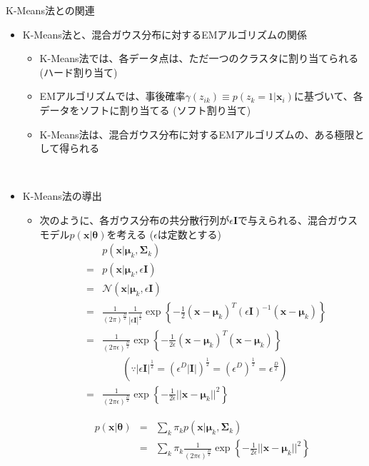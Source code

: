\documentclass[dvipdfmx,notheorems,t]{beamer}
\begin{document}
\begin{frame}{K-Means法との関連}

\begin{itemize}
	\item K-Means法と、混合ガウス分布に対するEMアルゴリズムの関係
	\begin{itemize}
		\item K-Means法では、各データ点は、ただ一つのクラスタに割り当てられる (\alert{ハード割り当て})
		\item EMアルゴリズムでは、事後確率$\gamma(z_{ik}) \equiv p(z_k = 1 | \bm{x}_i)$に基づいて、各データをソフトに割り当てる (\alert{ソフト割り当て})
		\newline
		\item K-Means法は、混合ガウス分布に対するEMアルゴリズムの、\alert{ある極限として得られる}
	\end{itemize} \
	
	\framebreak
	
	\item K-Means法の導出
	\begin{itemize}
		\item 次のように、各ガウス分布の共分散行列が$\epsilon \bm{I}$で与えられる、混合ガウスモデル$p(\bm{x} | \bm{\theta})$を考える ($\epsilon$は定数とする)
		\begin{eqnarray}
			&& p(\bm{x} | \bm{\mu}_k, \bm{\Sigma}_k) \nonumber \\
			&=& p(\bm{x} | \bm{\mu}_k, \epsilon \bm{I}) \nonumber \\
			&=& \mathcal{N}(\bm{x} | \bm{\mu}_k, \epsilon \bm{I}) \nonumber \\
			&=& \frac{1}{(2\pi)^\frac{D}{2}} \frac{1}{|\epsilon \bm{I}|^\frac{1}{2}} \exp \left\{ -\frac{1}{2} (\bm{x} - \bm{\mu}_k)^T (\epsilon \bm{I})^{-1} (\bm{x} - \bm{\mu}_k) \right\} \\
			&=& \frac{1}{(2\pi \epsilon)^\frac{D}{2}} \exp \left\{ -\frac{1}{2\epsilon} (\bm{x} - \bm{\mu}_k)^T (\bm{x} - \bm{\mu}_k) \right\} \\
			&& \qquad (\because |\epsilon \bm{I}|^\frac{1}{2} = \left( \epsilon^D |\bm{I}| \right)^\frac{1}{2} = \left( \epsilon^D \right)^\frac{1}{2} = \epsilon^\frac{D}{2}) \nonumber \\
			&=& \frac{1}{(2\pi \epsilon)^\frac{D}{2}} \exp \left\{ -\frac{1}{2\epsilon} || \bm{x} - \bm{\mu}_k ||^2 \right\}
		\end{eqnarray}
		
		\begin{eqnarray}
			p(\bm{x} | \bm{\theta}) &=& \sum_k \pi_k p(\bm{x} | \bm{\mu}_k, \bm{\Sigma}_k) \\
			&=& \sum_k \pi_k \frac{1}{(2\pi \epsilon)^\frac{D}{2}} \exp \left\{ -\frac{1}{2\epsilon} || \bm{x} - \bm{\mu}_k ||^2 \right\}
		\end{eqnarray}
		

\end{itemize}
\end{itemize}
\end{frame}
\end{document}
